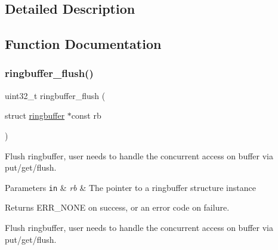\subsection{Detailed Description}


\subsection{Function Documentation}
\mbox{\label{group__doc__driver__hal__utils__ringbuffer_ga804ce09a6a02d883da66618ff16cd8f0}} 
\subsubsection{\texorpdfstring{ringbuffer\+\_\+flush()}{ringbuffer\_flush()}}
{\footnotesize\ttfamily uint32\+\_\+t ringbuffer\+\_\+flush (\begin{DoxyParamCaption}\item[{struct \hyperlink{structringbuffer}{ringbuffer} $\ast$const}]{rb }\end{DoxyParamCaption})}



Flush ringbuffer, user needs to handle the concurrent access on buffer via put/get/flush. 


\begin{DoxyParams}[1]{Parameters}
\mbox{\tt in}  & {\em rb} & The pointer to a ringbuffer structure instance\\
\hline
\end{DoxyParams}
\begin{DoxyReturn}{Returns}
E\+R\+R\+\_\+\+N\+O\+NE on success, or an error code on failure.
\end{DoxyReturn}
Flush ringbuffer, user needs to handle the concurrent access on buffer via put/get/flush. \mbox{\label{group__doc__driver__hal__utils__ringbuffer_ga46163f27edc3b85af50cbc4579e2e8aa}} 
